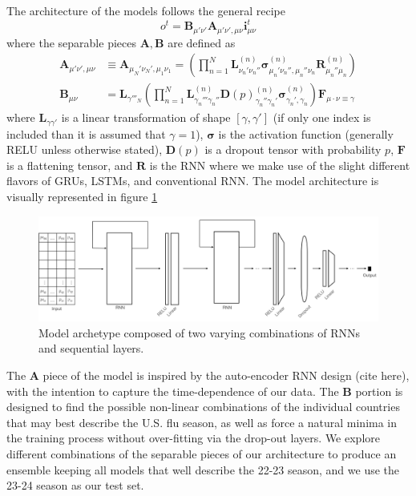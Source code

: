 \documentclass[12pt,a4paper,english]{article}
\begin{document}
The architecture of the models follows the general recipe
\begin{equation}
o^t = \mathbf{B}_{\mu'\nu'}\mathbf{A}_{\mu'\nu',\mu\nu}\mathbf{i}^t_{\mu\nu}
\end{equation}
where the separable pieces $\mathbf{A},\mathbf{B}$ are defined as 
\begin{align}
\mathbf{A}_{\mu'\nu',\mu\nu} &\equiv  \mathbf{A}_{\mu_N'\nu_N',\mu_1\nu_1} = \left(\prod_{n=1}^N \mathbf{L}^{(n)}_{\nu_n'\nu_n''}\mathbf{\sigma}^{(n)}_{\mu_n'\nu_n'',\mu_n''\nu_n}\mathbf{R}^{(n)}_{\mu_n''\mu_n}\right)\\
\mathbf{B}_{\mu\nu} &=\mathbf{L}_{\gamma'''_N}\left(\prod_{n=1}^N\mathbf{L}_{\gamma_n'''\gamma_n''}^{(n)}\mathbf{D}(p)^{(n)}_{\gamma_n''\gamma_n'}\mathbf{\sigma}^{(n)}_{\gamma_n',\gamma_n}\right)\mathbf{F}_{\mu\cdot\nu\equiv \gamma} 
\end{align}
where $\mathbf{L}_{\gamma\gamma'}$ is a linear transformation of shape $[\gamma,\gamma']$ (if only one index is included than it is assumed that $\gamma = 1$), $\mathbf{\sigma}$ is the activation function (generally RELU unless otherwise stated), $\mathbf{D}(p)$ is a dropout tensor with probability $p$, $\mathbf{F}$ is a flattening tensor, and $\mathbf{R}$ is the RNN where we make use of the slight different flavors of GRUs, LSTMs, and conventional RNN. The model architecture is visually represented in figure \ref{fig:arch}

\begin{figure}[h!]
		\begin{center}
		\includegraphics[scale=0.5]{Pictures/model_arch.png}
		\caption{Model archetype composed of two varying combinations of RNNs and sequential layers.}
		\end{center}
		\label{fig:arch}
	\end{figure}
\FloatBarrier

The $\mathbf{A}$ piece of the model is inspired by the auto-encoder RNN design (cite here), with the intention to capture the time-dependence of our data. The $\mathbf{B}$ portion is designed to find the possible non-linear combinations of the individual countries that may best describe the U.S. flu season, as well as force a natural minima in the training process without over-fitting via the drop-out layers. We explore different combinations of the separable pieces of our architecture to produce an ensemble keeping all models that well describe the 22-23 season, and we use the 23-24 season as our test set. 
\end{document}
